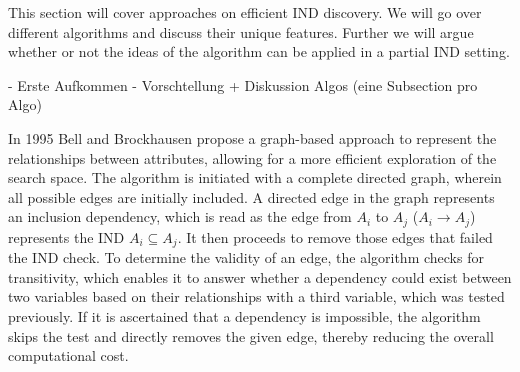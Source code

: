 
This section will cover approaches on efficient IND discovery. We will go over different algorithms and discuss their unique features. Further we will argue whether or not the ideas of the algorithm can be applied in a partial IND setting.



- Erste Aufkommen
- Vorschtellung + Diskussion Algos (eine Subsection pro Algo)

In 1995 Bell and Brockhausen \cite{bell1995discovery} propose a graph-based approach to represent the relationships between attributes, allowing for a more efficient exploration of the search space. The algorithm is initiated with a complete directed graph, wherein all possible edges are initially included. A directed edge in the graph represents an inclusion dependency, which is read as the edge from $A_i$ to $A_j$ ($A_i \rightarrow A_j$) represents the IND $A_i \subseteq A_j$. It then proceeds to remove those edges that failed the IND check. To determine the validity of an edge, the algorithm checks for transitivity, which enables it to answer whether a dependency could exist between two variables based on their relationships with a third variable, which was tested previously. If it is ascertained that a dependency is impossible, the algorithm skips the test and directly removes the given edge, thereby reducing the overall computational cost.
